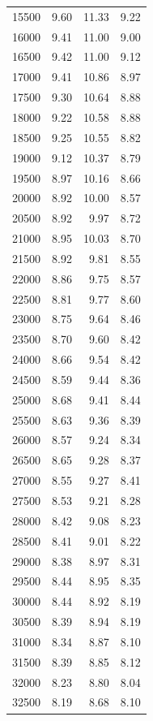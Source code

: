 \begin{table}[htbp]
\begin{tabular}{rrrr}
    15500 & 9.60 & 11.33 & 9.22 \\
    16000 & 9.41 & 11.00 & 9.00 \\
    16500 & 9.42 & 11.00 & 9.12 \\
    17000 & 9.41 & 10.86 & 8.97 \\
    17500 & 9.30 & 10.64 & 8.88 \\
    18000 & 9.22 & 10.58 & 8.88 \\
    18500 & 9.25 & 10.55 & 8.82 \\
    19000 & 9.12 & 10.37 & 8.79 \\
    19500 & 8.97 & 10.16 & 8.66 \\
    20000 & 8.92 & 10.00 & 8.57 \\
    20500 & 8.92 & 9.97 & 8.72 \\
    21000 & 8.95 & 10.03 & 8.70 \\
    21500 & 8.92 & 9.81 & 8.55 \\
    22000 & 8.86 & 9.75 & 8.57 \\
    22500 & 8.81 & 9.77 & 8.60 \\
    23000 & 8.75 & 9.64 & 8.46 \\
    23500 & 8.70 & 9.60 & 8.42 \\
    24000 & 8.66 & 9.54 & 8.42 \\
    24500 & 8.59 & 9.44 & 8.36 \\
    25000 & 8.68 & 9.41 & 8.44 \\
    25500 & 8.63 & 9.36 & 8.39 \\
    26000 & 8.57 & 9.24 & 8.34 \\
    26500 & 8.65 & 9.28 & 8.37 \\
    27000 & 8.55 & 9.27 & 8.41 \\
    27500 & 8.53 & 9.21 & 8.28 \\
    28000 & 8.42 & 9.08 & 8.23 \\
    28500 & 8.41 & 9.01 & 8.22 \\
    29000 & 8.38 & 8.97 & 8.31 \\
    29500 & 8.44 & 8.95 & 8.35 \\
    30000 & 8.44 & 8.92 & 8.19 \\
    30500 & 8.39 & 8.94 & 8.19 \\
    31000 & 8.34 & 8.87 & 8.10 \\
    31500 & 8.39 & 8.85 & 8.12 \\
    32000 & 8.23 & 8.80 & 8.04 \\
    32500 & 8.19 & 8.68 & 8.10 \\

\end{tabular}
\end{table}
